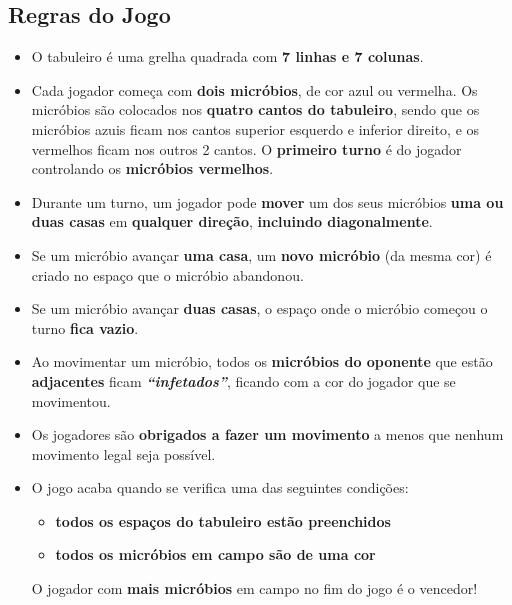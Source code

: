 \documentclass[a4paper]{article}
\begin{document}
\newpage\subsection{Regras do Jogo}

\bigskip
\begin{itemize}
    \item O tabuleiro é uma grelha quadrada com \textbf{7 linhas e 7 colunas}.
    \item Cada jogador começa com \textbf{dois micróbios}, de cor azul ou vermelha. Os micróbios são colocados nos \textbf{quatro cantos do tabuleiro}, sendo que os micróbios azuis ficam nos cantos superior esquerdo e inferior direito, e os vermelhos ficam nos outros 2 cantos. O \textbf{primeiro turno} é do jogador controlando os \textbf{micróbios vermelhos}.
    \item Durante um turno, um jogador pode \textbf{mover} um dos seus micróbios \textbf{uma ou duas casas} em \textbf{qualquer direção}, \textbf{incluindo diagonalmente}.
    \item Se um micróbio avançar \textbf{uma casa}, um \textbf{novo micróbio} (da mesma cor) é criado no espaço que o micróbio abandonou.
    \item Se um micróbio avançar \textbf{duas casas}, o espaço onde o micróbio começou o turno \textbf{fica vazio}.
    \item Ao movimentar um micróbio, todos os \textbf{micróbios do oponente} que estão \textbf{adjacentes} ficam \textbf{\textit{“infetados”}}, ficando com a cor do jogador que se movimentou.
    \item Os jogadores são \textbf{obrigados a fazer um movimento} a menos que nenhum movimento legal seja possível. 
    \item O jogo acaba quando se verifica uma das seguintes condições:
    \begin{itemize}
        \item \textbf{todos os espaços do tabuleiro estão preenchidos}
        \item \textbf{todos os micróbios em campo são de uma cor}
    \end{itemize}
    O jogador com \textbf{mais micróbios} em campo no fim do jogo é o vencedor!

\end{itemize}
\end{document}
